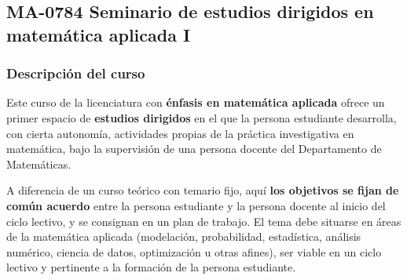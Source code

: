 \newpage
\subsection*{MA-0784 Seminario de estudios dirigidos en matemática aplicada I}

\hypertarget{MA0784}{}
\begin{refsection}
\begin{table}[H]
\end{table}

\subsubsection*{Descripción del curso}

Este curso de la licenciatura con \textbf{énfasis en matemática aplicada} ofrece un primer espacio de \textbf{estudios dirigidos} en el que la persona estudiante desarrolla, con cierta autonomía, actividades propias de la práctica investigativa en matemática, bajo la supervisión de una persona docente del Departamento de Matemáticas.

A diferencia de un curso teórico con temario fijo, aquí \textbf{los objetivos se fijan de común acuerdo} entre la persona estudiante y la persona docente al inicio del ciclo lectivo, y se consignan en un plan de trabajo. El tema debe situarse en áreas de la matemática aplicada (modelación, probabilidad, estadística, análisis numérico, ciencia de datos, optimización u otras afines), ser viable en un ciclo lectivo y pertinente a la formación de la persona estudiante.


\end{refsection}
